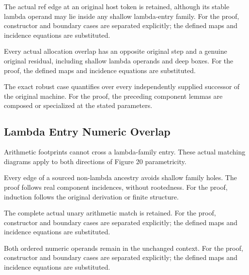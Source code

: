 The actual ref edge at an original host token is retained, although its stable lambda operand may lie inside any shallow lambda-entry family.
For the proof, constructor and boundary cases are separated explicitly; the defined maps and incidence equations are substituted.
\par{}

Every actual allocation overlap has an opposite original step and a genuine original residual, including shallow lambda operands and deep boxes.
For the proof, the defined maps and incidence equations are substituted.
\par{}

The exact robust case quantifies over every independently supplied successor of the original machine.
For the proof, the preceding component lemmas are composed or specialized at the stated parameters.
\par{}

\subsection{Lambda Entry Numeric Overlap}
Arithmetic footprints cannot cross a lambda-family entry. These actual matching diagrams apply to both directions of Figure 20 parametricity.

Every edge of a sourced non-lambda ancestry avoids shallow family holes. The proof follows real component incidences, without rootedness.
For the proof, induction follows the original derivation or finite structure.
\par{}

The complete actual unary arithmetic match is retained.
For the proof, constructor and boundary cases are separated explicitly; the defined maps and incidence equations are substituted.
\par{}

Both ordered numeric operands remain in the unchanged context.
For the proof, constructor and boundary cases are separated explicitly; the defined maps and incidence equations are substituted.
\par{}

